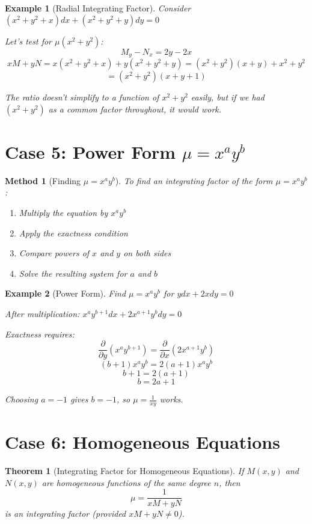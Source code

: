 \documentclass[12pt]{article}
\newtheorem{theorem}{Theorem}
\newtheorem{method}{Method}
\newtheorem{example}{Example}
\begin{document}
\begin{example}[Radial Integrating Factor]
Consider $(x^2 + y^2 + x)dx + (x^2 + y^2 + y)dy = 0$

Let's test for $\mu(x^2 + y^2)$:
\[M_y - N_x = 2y - 2x\]
\[xM + yN = x(x^2 + y^2 + x) + y(x^2 + y^2 + y) = (x^2 + y^2)(x + y) + x^2 + y^2\]
\[= (x^2 + y^2)(x + y + 1)\]

The ratio doesn't simplify to a function of $x^2 + y^2$ easily, but if we had $(x^2 + y^2)$ as a common factor throughout, it would work.
\end{example}

\section{Case 5: Power Form $\mu = x^a y^b$}

\begin{method}[Finding $\mu = x^a y^b$]
To find an integrating factor of the form $\mu = x^a y^b$:
\begin{enumerate}
    \item Multiply the equation by $x^a y^b$
    \item Apply the exactness condition
    \item Compare powers of $x$ and $y$ on both sides
    \item Solve the resulting system for $a$ and $b$
\end{enumerate}
\end{method}

\begin{example}[Power Form]
Find $\mu = x^a y^b$ for $y dx + 2x dy = 0$

After multiplication: $x^a y^{b+1} dx + 2x^{a+1} y^b dy = 0$

Exactness requires:
\[\frac{\partial}{\partial y}(x^a y^{b+1}) = \frac{\partial}{\partial x}(2x^{a+1} y^b)\]
\[(b+1)x^a y^b = 2(a+1)x^a y^b\]
\[b + 1 = 2(a + 1)\]
\[b = 2a + 1\]

Choosing $a = -1$ gives $b = -1$, so $\mu = \frac{1}{xy}$ works.
\end{example}

\section{Case 6: Homogeneous Equations}

\begin{theorem}[Integrating Factor for Homogeneous Equations]
If $M(x,y)$ and $N(x,y)$ are homogeneous functions of the same degree $n$, then
\[\mu = \frac{1}{xM + yN}\]
is an integrating factor (provided $xM + yN \neq 0$).
\end{theorem}
\end{document}
